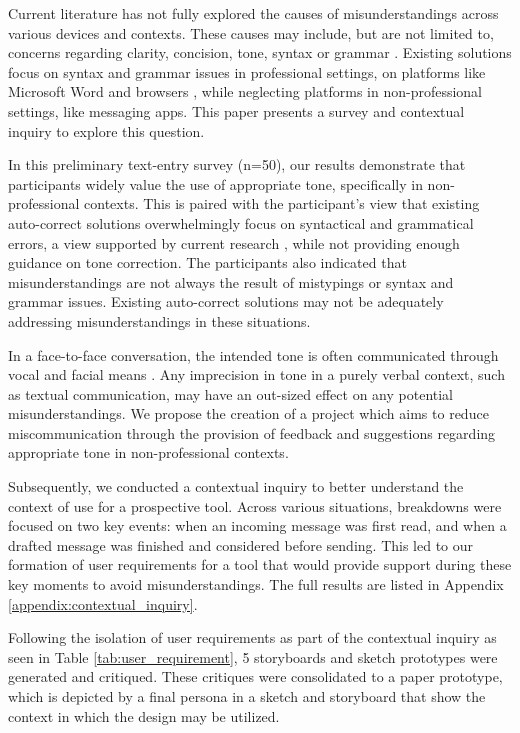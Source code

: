 \documentclass[acmsmall,screen,authorversion,nonacm]{acmart}
\begin{document}
Current literature has not fully explored the causes of misunderstandings across various devices and contexts. These causes may include, but are not limited to, concerns regarding clarity, concision, tone, syntax or grammar \cite{Kelly_Miller-Ott_2018}. Existing solutions focus on syntax and grammar issues in professional settings, on platforms like Microsoft Word and browsers \cite{shin_kim_2022}, while neglecting platforms in non-professional settings, like messaging apps. This paper presents a survey and contextual inquiry to explore this question. 

In this preliminary text-entry survey (n=50), our results demonstrate that participants widely value the use of appropriate tone, specifically in non-professional contexts. This is paired with the participant's view that existing auto-correct solutions overwhelmingly focus on syntactical and grammatical errors, a view supported by current research \cite{Shah_de_2020}, while not providing enough guidance on tone correction. The participants also indicated that misunderstandings are not always the result of mistypings or syntax and grammar issues. Existing auto-correct solutions may not be adequately addressing misunderstandings in these situations. 

In a face-to-face conversation, the intended tone is often communicated through vocal and facial means \cite{in_person_comm_breakdown}. Any imprecision in tone in a purely verbal context, such as textual communication, may have an out-sized effect on any potential misunderstandings. We propose the creation of a project which aims to reduce miscommunication through the provision of feedback and suggestions regarding appropriate tone in non-professional contexts.

Subsequently, we conducted a contextual inquiry to better understand the context of use for a prospective tool. Across various situations, breakdowns were focused on two key events: when an incoming message was first read, and when a drafted message was finished and considered before sending. This led to our formation of user requirements for a tool that would provide support during these key moments to avoid misunderstandings. The full results are listed in Appendix \ref{appendix:contextual_inquiry}.

Following the isolation of user requirements as part of the contextual inquiry as seen in Table \ref{tab:user_requirement}, 5 storyboards and sketch prototypes were generated and critiqued. These critiques were consolidated to a paper prototype, which is depicted by a final persona in a sketch and storyboard that show the context in which the design may be utilized.
\end{document}
